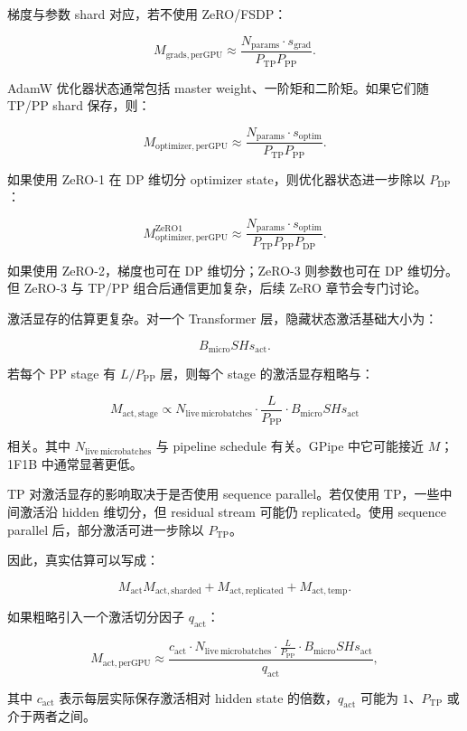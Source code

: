 梯度与参数 shard 对应，若不使用 ZeRO/FSDP：

\[
M_{\mathrm{grads,perGPU}}
\approx
\frac{N_{\mathrm{params}}\cdot s_{\mathrm{grad}}}
{P_{\mathrm{TP}}P_{\mathrm{PP}}}.
\]

AdamW 优化器状态通常包括 master weight、一阶矩和二阶矩。如果它们随 TP/PP shard 保存，则：

\[
M_{\mathrm{optimizer,perGPU}}
\approx
\frac{N_{\mathrm{params}}\cdot s_{\mathrm{optim}}}
{P_{\mathrm{TP}}P_{\mathrm{PP}}}.
\]

如果使用 ZeRO-1 在 DP 维切分 optimizer state，则优化器状态进一步除以 $P_{\mathrm{DP}}$：

\[
M_{\mathrm{optimizer,perGPU}}^{\mathrm{ZeRO1}}
\approx
\frac{N_{\mathrm{params}}\cdot s_{\mathrm{optim}}}
{P_{\mathrm{TP}}P_{\mathrm{PP}}P_{\mathrm{DP}}}.
\]

如果使用 ZeRO-2，梯度也可在 DP 维切分；ZeRO-3 则参数也可在 DP 维切分。但 ZeRO-3 与 TP/PP 组合后通信更加复杂，后续 ZeRO 章节会专门讨论。

激活显存的估算更复杂。对一个 Transformer 层，隐藏状态激活基础大小为：

\[
B_{\mathrm{micro}}S H s_{\mathrm{act}}.
\]

若每个 PP stage 有 $L/P_{\mathrm{PP}}$ 层，则每个 stage 的激活显存粗略与：

\[
M_{\mathrm{act,stage}}
\propto
N_{\mathrm{live\ microbatches}}
\cdot
\frac{L}{P_{\mathrm{PP}}}
\cdot
B_{\mathrm{micro}}S Hs_{\mathrm{act}}
\]

相关。其中 $N_{\mathrm{live\ microbatches}}$ 与 pipeline schedule 有关。GPipe 中它可能接近 $M$；1F1B 中通常显著更低。

TP 对激活显存的影响取决于是否使用 sequence parallel。若仅使用 TP，一些中间激活沿 hidden 维切分，但 residual stream 可能仍 replicated。使用 sequence parallel 后，部分激活可进一步除以 $P_{\mathrm{TP}}$。

因此，真实估算可以写成：

\[
M_{\mathrm{act}}
M_{\mathrm{act,sharded}}
+
M_{\mathrm{act,replicated}}
+
M_{\mathrm{act,temp}}.
\]

如果粗略引入一个激活切分因子 $q_{\mathrm{act}}$：

\[
M_{\mathrm{act,perGPU}}
\approx
\frac{
c_{\mathrm{act}}
\cdot
N_{\mathrm{live\ microbatches}}
\cdot
\frac{L}{P_{\mathrm{PP}}}
\cdot
B_{\mathrm{micro}}S Hs_{\mathrm{act}}
}
{q_{\mathrm{act}}},
\]

其中 $c_{\mathrm{act}}$ 表示每层实际保存激活相对 hidden state 的倍数，$q_{\mathrm{act}}$ 可能为 $1$、$P_{\mathrm{TP}}$ 或介于两者之间。

